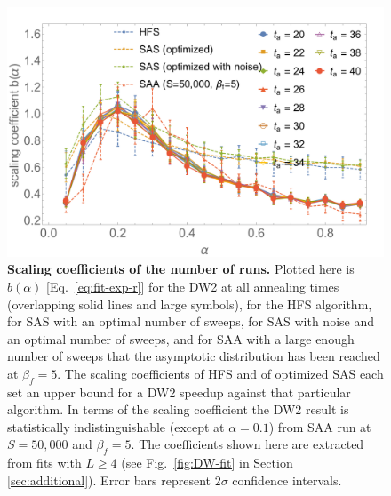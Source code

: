 \begin{figure}[t]
\begin{center}
\includegraphics[width=\columnwidth]{chapters/Planted/slopeDW-vs-HFS-vs-SAopt-vs-SAS-vs-SASnoisy.pdf}
\caption{\textbf{Scaling coefficients of the number of runs.} Plotted here is $b(\alpha)$ [Eq.~\eqref{eq:fit-exp-r}] for the DW2 at all annealing times (overlapping solid lines and large symbols), for the HFS algorithm, for SAS with an optimal number of sweeps, for SAS with noise and an optimal number of sweeps, and for SAA with a large enough number of sweeps that the asymptotic distribution has been reached at $\beta_f=5$. The scaling coefficients of HFS and of optimized SAS each set an upper bound for a DW2 speedup against that particular algorithm.  In terms of the scaling coefficient the DW2 result is statistically indistinguishable (except at $\alpha=0.1$) from SAA run at $S=50,\!000$ and $\beta_f=5$. The coefficients shown here are extracted from fits with $L\geq 4$ (see Fig.~\ref{fig:DW-fit} in Section \ref{sec:additional}). Error bars represent $2\sigma$ confidence intervals.}
\label{fig:DWslope}
\end{center}
\end{figure}


